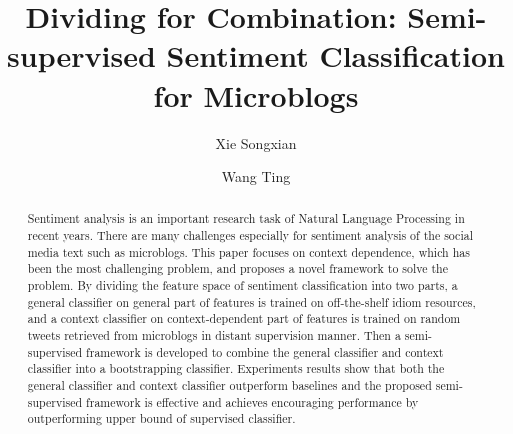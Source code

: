 \documentclass{llncs}
\begin{document}
\mainmatter  %

\title{Dividing for Combination: Semi-supervised Sentiment Classification for Microblogs}
%
\author{Xie Songxian%
\and Wang Ting}
%

\maketitle

\begin{abstract}
Sentiment analysis is an important research task of Natural Language Processing in recent years.
There are many challenges especially for sentiment analysis of the social media text such as microblogs. 
This paper focuses on context dependence, which has been the most challenging problem, and proposes a novel framework to solve the problem.
By dividing the feature space of sentiment classification into two parts, a general classifier on general part of features is trained on off-the-shelf idiom resources, and a context classifier on context-dependent part of features is trained on random tweets retrieved from microblogs in distant supervision manner. 
Then a semi-supervised framework is developed to combine the general classifier and context classifier into a bootstrapping classifier. 
Experiments results show that both the general classifier and context classifier outperform baselines and the proposed semi-supervised framework is effective and achieves encouraging performance by outperforming upper bound of supervised classifier. 
\end{abstract}
\end{document}
